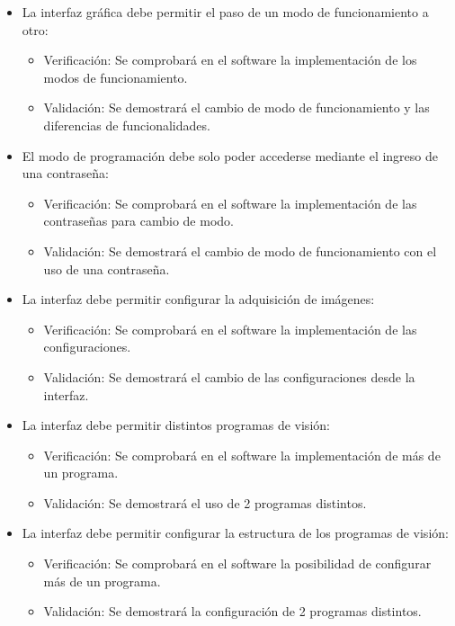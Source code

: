\documentclass[
11pt, %
codirector, %
]{charter}
\begin{document}
\begin{itemize}
	\item \REQ La interfaz gráfica debe permitir el paso de un modo de funcionamiento a otro:
	\begin{itemize}
		\item Verificación: Se comprobará en el software la implementación de los modos de funcionamiento.
		\item Validación: Se demostrará el cambio de modo de funcionamiento y las diferencias de funcionalidades.
	\end{itemize}
	
	\item \REQ El modo de programación debe solo poder accederse mediante el ingreso de una contraseña:
	\begin{itemize}
		\item Verificación: Se comprobará en el software la implementación de las contraseñas para cambio de modo.
		\item Validación: Se demostrará el cambio de modo de funcionamiento con el uso de una contraseña.
	\end{itemize}
	
	\item \REQ La interfaz debe permitir configurar la adquisición de imágenes:
	\begin{itemize}
		\item Verificación: Se comprobará en el software la implementación de las configuraciones.
		\item Validación: Se demostrará el cambio de las configuraciones desde la interfaz.
	\end{itemize}
	
	\item \REQ La interfaz debe permitir distintos programas de visión:
	\begin{itemize}
		\item Verificación: Se comprobará en el software la implementación de más de un programa.
		\item Validación: Se demostrará el uso de 2 programas distintos.
	\end{itemize}
	
	\item \REQ La interfaz debe permitir configurar la estructura de los programas de visión:
	\begin{itemize}
		\item Verificación: Se comprobará en el software la posibilidad de configurar más de un programa.
		\item Validación: Se demostrará la configuración de 2 programas distintos.
	\end{itemize}
	

\end{itemize}
\end{document}
